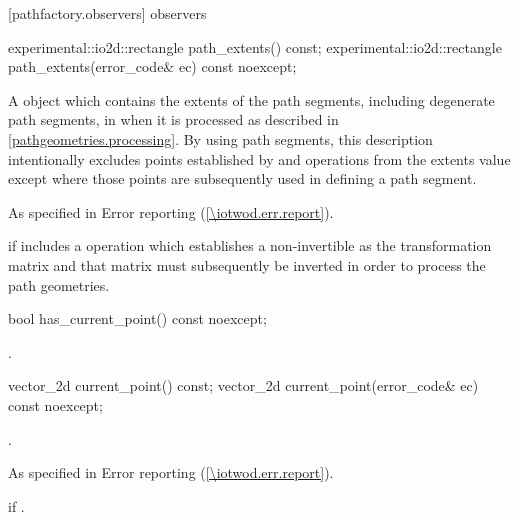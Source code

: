  [pathfactory.observers] { observers}

\begin{itemdecl}
    experimental::io2d::rectangle path_extents() const;
    experimental::io2d::rectangle path_extents(error_code& ec) const noexcept;
\end{itemdecl}
\begin{itemdescr}
	\pnum
	\returns
	A  object which contains the extents of the path segments, including degenerate path segments, in  when it is processed as described in \ref{pathgeometries.processing}.
	\enternote
	By using path segments, this description intentionally excludes points established by  and  operations from the extents value except where those points are subsequently used in defining a path segment.
	\exitnote

	\pnum
	\throws
	As specified in Error reporting (\ref{\iotwod.err.report}).

	\pnum
	\errors
	 if  includes a  operation which establishes a non-invertible  as the transformation matrix and that matrix must subsequently be inverted in order to process the path geometries.
\end{itemdescr}

\begin{itemdecl}
    bool has_current_point() const noexcept;
\end{itemdecl}
\begin{itemdescr}
	\pnum
	\returns
	.
\end{itemdescr}

\begin{itemdecl}
    vector_2d current_point() const;
    vector_2d current_point(error_code& ec) const noexcept;
\end{itemdecl}
\begin{itemdescr}
	\pnum
	\returns
	.

	\pnum
	\throws
	As specified in Error reporting (\ref{\iotwod.err.report}).

	\pnum
	\errors
	 if .
\end{itemdescr}

